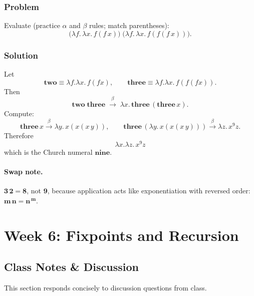\documentclass{article}
\theoremstyle{theorem}
\theoremstyle{definition}
\theoremstyle{remark}
\begin{document}
\subsubsection*{Problem}
Evaluate (practice $\alpha$ and $\beta$ rules; match parentheses):
\[
\Big(\lambda f.\,\lambda x.\,f(f\,x)\Big)\;
\Big(\lambda f.\,\lambda x.\,f(f(f\,x))\Big).
\]

\subsubsection*{Solution}
Let
\[
\mathbf{two} \equiv \lambda f.\lambda x.\,f(fx),\qquad
\mathbf{three} \equiv \lambda f.\lambda x.\,f(f(fx)).
\]
Then
\[
\mathbf{two}\;\mathbf{three}
\;\xrightarrow{\beta}\;
\lambda x.\,\mathbf{three}\,(\mathbf{three}\,x).
\]
Compute:
\[
\mathbf{three}\,x \xrightarrow{\beta} \lambda y.\,x(x(x\,y)),
\qquad
\mathbf{three}\,(\lambda y.\,x(x(x\,y))) \xrightarrow{\beta} \lambda z.\,x^{9}z.
\]
Therefore
\[
\boxed{\lambda x.\lambda z.\,x^{9}z}
\]
which is the Church numeral $\mathbf{nine}$.

\paragraph{Swap note.}
$\mathbf{3}\,\mathbf{2}=\mathbf{8}$, not $\mathbf{9}$, because application acts like exponentiation with reversed order: $\mathbf{m}\,\mathbf{n}=\mathbf{n}^{\,\mathbf{m}}$.

\section{Week 6: Fixpoints and Recursion}

\subsection{Class Notes \& Discussion}
This section responds concisely to discussion questions from class.
\end{document}
